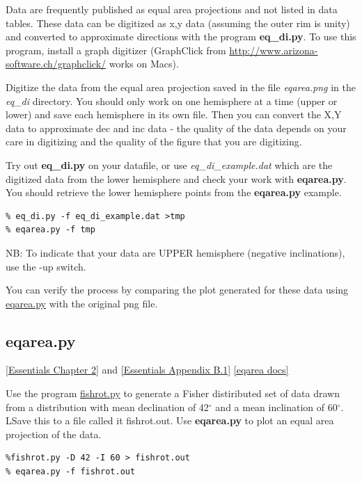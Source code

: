 \documentclass[11pt]{book}
\begin{document}
{{{Data are frequently  published as equal area projections and not listed in data tables.  These data can be digitized as x,y data (assuming the outer rim is unity) and converted to approximate directions with the program {\bf eq\_di.py}.  To use this program, install a graph digitizer (GraphClick from \url{http://www.arizona-software.ch/graphclick/} works on Macs).

Digitize the data from the equal area projection saved in the file {\it eqarea.png} in the {\it eq\_di} directory.
You should only work on one hemisphere at a time (upper or lower) and save each hemisphere in its own file.  Then you can convert the X,Y data to approximate dec and inc data - the quality of the data depends on your care in digitizing and the quality of the figure that you are digitizing.  

Try out {\bf eq\_di.py} on your datafile, or use {\it eq\_di\_example.dat} which are the digitized data from the lower hemisphere and check your work with {\bf eqarea.py}.  You should retrieve the lower hemisphere points from the {\bf eqarea.py} example.  

\begin{verbatim}
% eq_di.py -f eq_di_example.dat >tmp
% eqarea.py -f tmp
\end{verbatim}

NB: To indicate that your data are UPPER hemisphere (negative inclinations), use the -up switch.  


You can verify the process by comparing the plot generated for these data using \href{#eqarea.py}{eqarea.py} with the original png file.  


%
\subsection{eqarea.py}
\href{http://magician.ucsd.edu/Essentials_2/WebBook2ch2.html#ch2}{ [Essentials Chapter 2]} and 
\href{http://magician.ucsd.edu/Essentials_2/WebBook2ap1.html#Plots_useful_in_paleomagnetism}{[Essentials Appendix B.1]}
\href{http://earthref.org/PmagPy/pmagpydocs/eqarea-module.html}{[eqarea docs]}

Use the program \href{#fishrot.py}{fishrot.py} to generate a Fisher distiributed set of data drawn from a distribution with mean declination of 42$^{\circ}$ and a mean inclination of 60$^{\circ}$.  LSave this to a file called {it fishrot.out}.   Use {\bf eqarea.py} to 
plot an equal area projection of the data.

\begin{verbatim}
%fishrot.py -D 42 -I 60 > fishrot.out
% eqarea.py -f fishrot.out
\end{verbatim}

}}}
\end{document}
